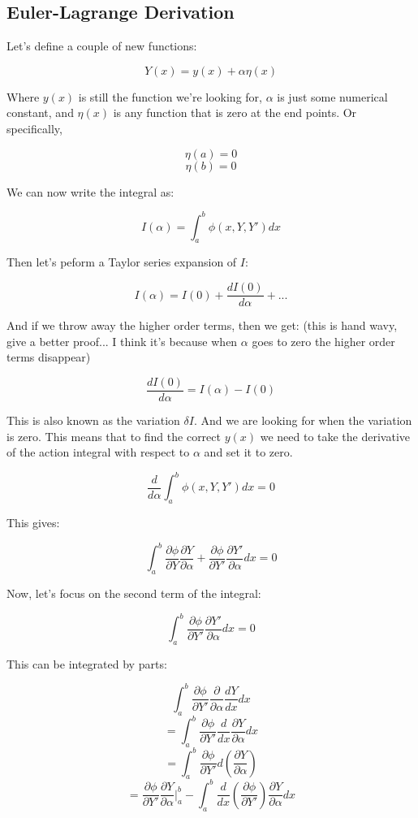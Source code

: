\documentclass{article}
\begin{document}
%
%
%
\subsection{Euler-Lagrange Derivation}

Let's define a couple of new functions:

$$Y( x ) = y( x ) + \alpha \eta( x )$$

Where $y( x )$ is still the function we're looking for, $\alpha$ is just some numerical constant, and $\eta( x )$ is any function that is zero at the end points.  Or specifically,

$$\eta( a ) = 0$$
$$\eta( b ) = 0$$

We can now write the integral as:

$$I( \alpha ) = \int_a^b \phi( x, Y, Y' ) dx$$

Then let's peform a Taylor series expansion of $I$:

$$I( \alpha ) = I( 0 ) + \frac{ dI( 0 ) }{ d\alpha } + ...$$

And if we throw away the higher order terms, then we get: (this is hand wavy, give a better proof... I think it's because when $\alpha$ goes to zero the higher order terms disappear)

$$\frac{ dI( 0 ) }{ d\alpha } = I( \alpha ) - I( 0 )$$

This is also known as the variation $\delta I$.  And we are looking for when the variation is zero.  This means that to find the correct $y( x )$ we need to take the derivative of the action integral with respect to $\alpha$ and set it to zero.

$$\frac{ d }{ d\alpha } \int_a^b \phi( x, Y, Y' ) dx = 0$$

This gives:

$$\int_a^b \frac{ \partial \phi }{ \partial Y } \frac{ \partial Y }{ \partial \alpha } + \frac{ \partial \phi }{ \partial Y' } \frac{ \partial Y' }{ \partial \alpha } dx = 0$$

Now, let's focus on the second term of the integral:

$$\int_a^b \frac{ \partial \phi }{ \partial Y' } \frac{ \partial Y' }{ \partial \alpha } dx = 0$$

This can be integrated by parts:

$$\int_a^b \frac{ \partial \phi }{ \partial Y' } \frac{ \partial }{ \partial \alpha } \frac{ dY }{ dx } dx$$
$$ = \int_a^b \frac{ \partial \phi }{ \partial Y' } \frac{ d }{ dx } \frac{ \partial Y }{ \partial \alpha } dx$$
$$ = \int_a^b \frac{ \partial \phi }{ \partial Y' } d( \frac{ \partial Y }{ \partial \alpha } )$$
$$ = \frac{ \partial \phi }{ \partial Y' } \frac{ \partial Y }{ \partial \alpha } \Big|_a^b - \int_a^b \frac{ d }{ dx } ( \frac{ \partial \phi }{ \partial Y' } ) \frac{ \partial Y }{ \partial \alpha } dx$$
\end{document}
